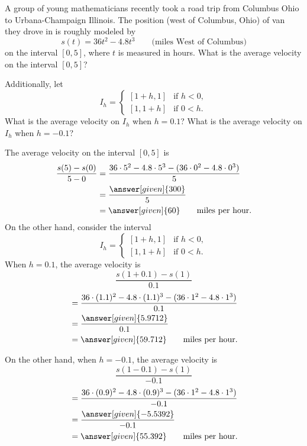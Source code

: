 \documentclass{ximera}
\begin{document}
\begin{example}
A group of young mathematicians recently took a road trip from
Columbus Ohio to Urbana-Champaign Illinois. The position (west of
Columbus, Ohio) of van they drove in is roughly modeled by
\[
s(t) = 36t^2 - 4.8t^3 \qquad\text{(miles West of Columbus)} %
\]
on the interval $[0,5]$, where $t$ is measured in hours. What is the
average velocity on the interval $[0,5]$?

Additionally, let
\[
I_h= \begin{cases}
  [1+h,1]  & \text{if $h<0$}, \\ %
  [1,1+h]  & \text{if $0<h$}.     %
\end{cases}
\]
What is the average velocity on $I_h$ when $h= 0.1$?
What is the average velocity on $I_h$ when $h= -0.1$?
\begin{explanation}
  The average velocity on the interval $[0,5]$ is
  \begin{align*}
  \frac{s(5)-s(0)}{5-0} &= \frac{36\cdot 5^2 - 4.8\cdot 5^3 - (36\cdot 0^2 - 4.8\cdot 0^3)}{5}\\
  &=\frac{\answer[given]{300}}{5}\\
  &=\answer[given]{60}\qquad\text{miles per hour.}
  \end{align*}
  On the other hand, consider the interval
  \[
  I_h = 
  \begin{cases}
    [1+h,1]  & \text{if $h<0$}, \\ %
    [1,1+h]  & \text{if $0<h$}.     %
  \end{cases}
  \]
  When $h = 0.1$, the average velocity is
  \[
  \frac{s(1+0.1)-s(1)}{0.1}
  \]
  \begin{align*}
    &= \frac{36\cdot (1.1)^2 - 4.8\cdot (1.1)^3 - (36\cdot 1^2 - 4.8 \cdot 1^3)}{0.1}\\
    &=\frac{\answer[given]{5.9712}}{0.1}\\
    &=\answer[given]{59.712}\qquad\text{miles per hour.}
  \end{align*}
  
  On the other hand, when $h=-0.1$, the average velocity is
  \[
  \frac{s(1-0.1)-s(1)}{-0.1}
  \]
  \begin{align*}
    &= \frac{36\cdot (0.9)^2 - 4.8\cdot (0.9)^3 - (36\cdot 1^2 - 4.8 \cdot 1^3)}{-0.1}\\
    &=\frac{\answer[given]{-5.5392}}{-0.1}\\
    &=\answer[given]{55.392}\qquad\text{miles per hour.}
  \end{align*}
\end{explanation}
\end{example}
\end{document}
